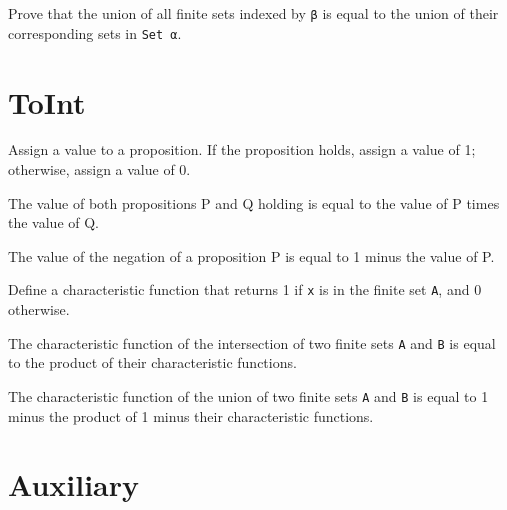 \begin{lemma}\label{eq_FinUnion₀}
  Prove that the union of all finite sets indexed by \verb|β| is equal to the union of their corresponding sets in \verb|Set α|.
\end{lemma}

\section{ToInt}

\begin{definition}\label{toInt}
  \leanok
  Assign a value to a proposition. If the proposition holds, assign a value of 1; otherwise, assign a value of 0.
\end{definition}

\begin{lemma}\label{toInt_and}
  The value of both propositions P and Q holding is equal to the value of P times the value of Q.
\end{lemma}

\begin{lemma}\label{toInt_not}
  The value of the negation of a proposition P is equal to 1 minus the value of P.
\end{lemma}

\begin{definition}\label{char_fun}
  \leanok
  Define a characteristic function that returns 1 if \verb|x| is in the finite set \verb|A|, and 0 otherwise.
\end{definition}

\begin{lemma}\label{char_fun_inter}
  The characteristic function of the intersection of two finite sets \verb|A| and \verb|B| is equal to the product of their characteristic functions.
\end{lemma}

\begin{lemma}\label{char_fun_union}
  The characteristic function of the union of two finite sets \verb|A| and \verb|B| is equal to 1 minus the product of 1 minus their characteristic functions.
\end{lemma}
\section{Auxiliary}

